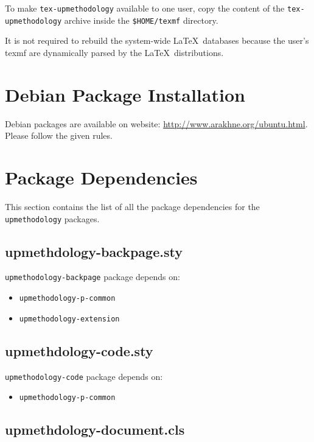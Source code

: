 \documentclass[book]{upmethodology-document}
\begin{document}
To make \texttt{tex-upmethodology} available to one user, copy the content of the \texttt{tex-upmethodology} archive inside the \texttt{\$HOME/texmf} directory.

It is not required to rebuild the system-wide \LaTeX\ databases because the user's texmf are dynamically parsed by the \LaTeX\ distributions.

\section{Debian Package Installation}

Debian packages are available on \arakhneorg website: \url{http://www.arakhne.org/ubuntu.html}. Please follow the given rules.

\section{Package Dependencies}

This section contains the list of all the package dependencies for the \texttt{upmethodology} packages.

\subsection{upmethdology-backpage.sty}

\texttt{upmethodology-backpage} package depends on:
\begin{itemize}
\item \texttt{upmethodology-p-common}
\item \texttt{upmethodology-extension}
\end{itemize}

\subsection{upmethdology-code.sty}

\texttt{upmethodology-code} package depends on:
\begin{itemize}
\item \texttt{upmethodology-p-common}
\end{itemize}

\subsection{upmethdology-document.cls}
\end{document}

